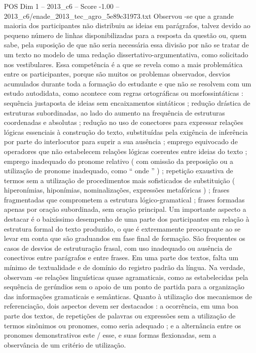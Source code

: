 \begin{textsample}{POS Dim 1 – 2013\_c6 – Score -1.00 – 2013\_c6/enade\_2013\_tec\_agro\_5e89c31973.txt}
Observou -se que a grande maioria dos participantes não distribuiu as ideias em parágrafos, talvez devido ao pequeno número de linhas disponibilizadas para a resposta da questão ou, quem sabe, pela suposição de que não seria necessária essa divisão por não se tratar de um texto no modelo de uma redação dissertativo-argumentativa, como solicitado nos vestibulares.
Essa competência é a que se revela como a mais problemática entre os participantes, porque são muitos os problemas observados, desvios acumulados durante toda a formação do estudante e que não se resolvem com um estudo autodidata, como acontece com regras ortográficas ou morfossintáticas : sequência justaposta de ideias sem encaixamentos sintáticos ; redução drástica de estruturas subordinadas, ao lado do aumento na frequência de estruturas coordenadas e absolutas ; redução no uso de conectores para expressar relações lógicas essenciais à construção do texto, substituídas pela exigência de inferência por parte do interlocutor para suprir a sua ausência ; emprego equivocado de operadores que não estabelecem relações lógicas coerentes entre ideias do texto ; emprego inadequado do pronome relativo ( com omissão da preposição ou a utilização de pronome inadequado, como “ onde ” ) ; repetição exaustiva de termos sem a utilização de procedimentos mais sofisticados de substituição ( hiperonímias, hiponímias, nominalizações, expressões metafóricas ) ; frases fragmentadas que comprometem a estrutura lógico-gramatical ; frases formadas apenas por oração subordinada, sem oração principal.
Um importante aspecto a destacar é o baixíssimo desempenho de uma parte dos participantes em relação à estrutura formal do texto produzido, o que é extremamente preocupante ao se levar em conta que são graduandos em fase final de formação.
São frequentes os casos de desvios de estruturação frasal, com uso inadequado ou ausência de conectivos entre parágrafos e entre frases.
Em uma parte dos textos, falta um mínimo de textualidade e de domínio do registro padrão da língua.
Na verdade, observam -se relações linguísticas quase agramaticais, como as estabelecidas pela sequência de gerúndios sem o apoio de um ponto de partida para a organização das informações gramaticais e semânticas.
Quanto à utilização dos mecanismos de referenciação, dois aspectos devem ser destacados : a ocorrência, em uma boa parte dos textos, de repetições de palavras ou expressões sem a utilização de termos sinônimos ou pronomes, como seria adequado ; e a alternância entre os pronomes demonstrativos este / esse, e suas formas flexionadas, sem a observância de um critério de utilização.

\end{textsample}
